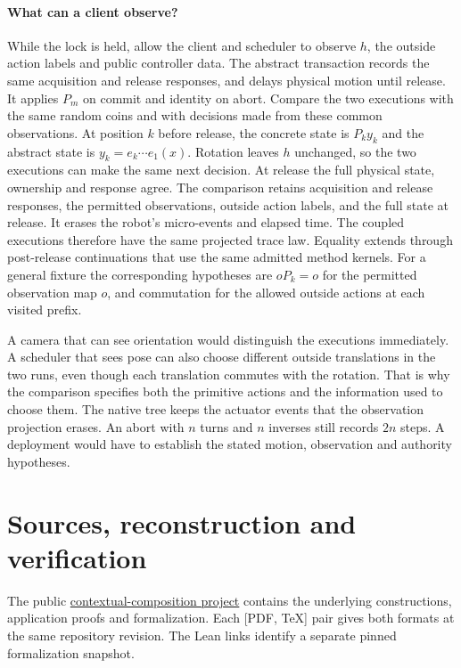 \documentclass[11pt]{article}
\numberwithin{equation}{section}
\theoremstyle{definition}\newtheorem{definition}[theorem]{Definition}
\begin{document}
\paragraph{What can a client observe?}
While the lock is held, allow the client and scheduler to observe
\(h\), the outside action labels and public controller data. The
abstract transaction records the same acquisition and release
responses, and delays physical motion until release. It applies
\(P_m\) on commit and identity on abort. Compare the two executions
with the same random coins and with decisions made from these common
observations. At position \(k\) before release, the concrete state is \(P_ky_k\) and
the abstract state is \(y_k=e_k\cdots e_1(x)\). Rotation leaves \(h\)
unchanged, so the two executions can make the same next decision.
At release the full physical state, ownership and response agree.
The comparison retains acquisition and release responses, the permitted
observations, outside action labels, and the full state at release. It
erases the robot's micro-events and elapsed time. The coupled executions
therefore have the same projected trace law. Equality extends through
post-release continuations that use the same admitted method kernels. For a general fixture the corresponding
hypotheses are \(oP_k=o\) for the permitted observation map \(o\), and
commutation for the allowed outside actions at each visited prefix.

A camera that can see orientation would distinguish the executions
immediately. A scheduler that sees pose can also choose different
outside translations in the two runs, even though each translation
commutes with the rotation. That is why the comparison specifies both
the primitive actions and the information used to choose them.
The native tree keeps the actuator events that the observation
projection erases. An abort with \(n\) turns and \(n\) inverses still
records \(2n\) steps. A deployment would have to establish the stated
motion, observation and authority hypotheses.

\section{Sources, reconstruction and verification}\label{app:reuse}
The public
\href{https://github.com/eternal-november/eos-research-programmes/tree/main/projects/contextual-composition}{contextual-composition project}
contains the underlying constructions, application proofs and formalization.
Each \textup{[PDF, TeX]} pair gives both formats at the same repository
revision. The Lean links identify a separate pinned formalization snapshot.
\end{document}
